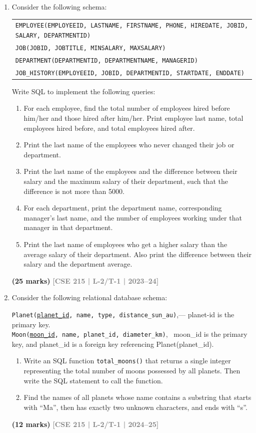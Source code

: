 \documentclass[12pt,a3paper]{article}
\newcommand{\yr}[1]{\hfill\textcolor{gray}{\small\textbf{[#1]}}}
\newcommand{\mk}[1]{\textcolor{orange!70!black}{\small\textbf{(#1 marks)}}}
\begin{document}
\begin{enumerate}
\item Consider the following schema:
\begin{center}
\begin{tabular}{l}
\texttt{EMPLOYEE(EMPLOYEEID, LASTNAME, FIRSTNAME, PHONE, HIREDATE, JOBID, SALARY, DEPARTMENTID)}\\
\texttt{JOB(JOBID, JOBTITLE, MINSALARY, MAXSALARY)}\\
\texttt{DEPARTMENT(DEPARTMENTID, DEPARTMENTNAME, MANAGERID)}\\
\texttt{JOB\_HISTORY(EMPLOYEEID, JOBID, DEPARTMENTID, STARTDATE, ENDDATE)}
\end{tabular}
\end{center}
Write SQL to implement the following queries:
\begin{enumerate}
  \item For each employee, find the total number of employees hired before him/her and those hired after him/her. Print employee last name, total employees hired before, and total employees hired after.
  \item Print the last name of the employees who never changed their job or department.
  \item Print the last name of the employees and the difference between their salary and the maximum salary of their department, such that the difference is not more than 5000.
  \item For each department, print the department name, corresponding manager's last name, and the number of employees working under that manager in that department.
  \item Print the last name of employees who get a higher salary than the average salary of their department. Also print the difference between their salary and the department average.
\end{enumerate}
\mk{25} \yr{CSE 215 | L-2/T-1 | 2023--24}

\item Consider the following relational database schema:
\begin{center}
\texttt{Planet(\underline{planet\_id}, name, type, distance\_sun\_au)},\quad --- planet-id is the primary key.
\\ \texttt{Moon(\underline{moon\_id}, name, planet\_id, diameter\_km)}, \ moon_id is the primary key, and planet_id is a foreign key referencing Planet(planet_id). 
\end{center}
\begin{enumerate}
  \item Write an SQL function \texttt{total\_moons()} that returns a single integer representing the total number of moons possessed by all planets. Then write the SQL statement to call the function.
  \item Find the names of all planets whose name contains a substring that starts with ``Ma'', then has exactly two unknown characters, and ends with ``s''.
\end{enumerate}
\mk{12} \yr{CSE 215 | L-2/T-1 | 2024--25}


\end{enumerate}
\end{document}
